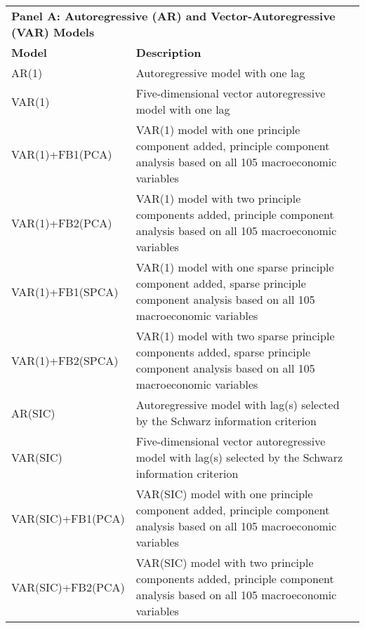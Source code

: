 \label{tab:model-description}
\begin{footnotesize}
\begin{tabularx}{\linewidth}{lX}
\caption{Models used in forecasting} \\
\toprule
\multicolumn{2}{l}{\textbf{Panel A: Autoregressive (AR) and Vector-Autoregressive (VAR) Models}} \\
\multicolumn{1}{l}{\textbf{Model}} & \multicolumn{1}{l}{\textbf{Description}} \\ \midrule
\endhead
\bottomrule
\endfoot
AR(1)                     & Autoregressive model with one lag                                                                                                            \\
VAR(1)                    & Five-dimensional vector autoregressive model with one lag                                                                                    \\
VAR(1)+FB1(PCA)           & VAR(1) model with one principle component added, principle component analysis based on all 105 macroeconomic variables                       \\
VAR(1)+FB2(PCA)           & VAR(1) model with two principle components added, principle component analysis based on all 105 macroeconomic variables                      \\
VAR(1)+FB1(SPCA)          & VAR(1) model with one sparse principle component added, sparse principle component analysis based on all 105 macroeconomic variables         \\
VAR(1)+FB2(SPCA)          & VAR(1) model with two sparse principle components added, sparse principle component analysis based on all 105 macroeconomic variables        \\
AR(SIC)                   & Autoregressive model with lag(s) selected by the Schwarz information criterion                                                               \\
VAR(SIC)                  & Five-dimensional vector autoregressive model with lag(s) selected by the Schwarz information criterion                                       \\
VAR(SIC)+FB1(PCA)         & VAR(SIC) model with one principle component added, principle component analysis based on all 105 macroeconomic variables                     \\
VAR(SIC)+FB2(PCA)         & VAR(SIC) model with two principle components added, principle component analysis based on all 105 macroeconomic variables                    \\

\end{tabularx}
\end{footnotesize}
